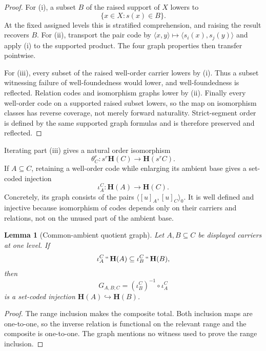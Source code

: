 \documentclass[11pt]{article}
\newtheorem{lemma}[theorem]{Lemma}
\numberwithin{equation}{section}
\theoremstyle{definition}
\theoremstyle{remark}
\newcommand{\inj}{\hookrightarrow}
\begin{document}
\begin{proof}
For (i), a subset $B$ of the raised support of $X$ lowers to
\[
 \{x\in X:s(x)\in B\}.
\]
At the fixed assigned levels this is stratified comprehension, and raising
the result recovers $B$.  For (ii), transport the pair code by
$\langle x,y\rangle\mapsto\langle s_i(x),s_j(y)\rangle$ and apply (i) to
the supported product.  The four graph properties then transfer
pointwise.

For (iii), every subset of the raised well-order carrier lowers by (i).
Thus a subset witnessing failure of well-foundedness would lower, and
well-foundedness is reflected.  Relation codes and isomorphism graphs lower
by (ii).  Finally every well-order code on a supported raised subset lowers,
so the map on isomorphism classes has reverse coverage, not merely forward
naturality.  Strict-segment order is defined by the same supported graph
formulas and is therefore preserved and reflected.
\end{proof}

Iterating part (iii) gives a natural order isomorphism
\begin{equation}
 \theta_C^r:s^r\mathbf H(C)\longrightarrow\mathbf H(s^rC).
 \label{eq:hartogs-support-naturality}
\end{equation}
If $A\subseteq C$, retaining a well-order code while enlarging its ambient
base gives a set-coded injection
\begin{equation}
 \iota_A^C:\mathbf H(A)\longrightarrow\mathbf H(C).
 \label{eq:hartogs-inclusion}
\end{equation}
Concretely, its graph consists of the pairs
$\langle[u]_A,[u]_C\rangle_0$.  It is well defined and injective because
isomorphism of codes depends only on their carriers and relations, not on
the unused part of the ambient base.

\begin{lemma}[Common-ambient quotient graph]
\label{lem:common-ambient-quotient-graph}
Let $A,B\subseteq C$ be displayed carriers at one level.  If
\[
 \iota_A^C\,``\,\mathbf H(A)
 \subseteq
 \iota_B^C\,``\,\mathbf H(B),
\]
then
\[
 G_{A,B;C}=(\iota_B^C)^{-1}\circ\iota_A^C
\]
is a set-coded injection $\mathbf H(A)\inj\mathbf H(B)$.
\end{lemma}

\begin{proof}
The range inclusion makes the composite total.  Both inclusion maps are
one-to-one, so the inverse relation is functional on the relevant range
and the composite is one-to-one.  The graph mentions no witness used to
prove the range inclusion.
\end{proof}
\end{document}
